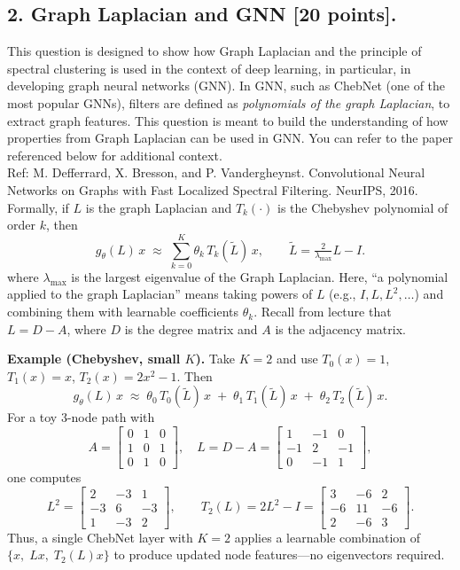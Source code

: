 \documentclass[twoside,10pt]{article}
\begin{document}
\clearpage

\subsection*{2. Graph Laplacian and GNN [20 points].}
This question is designed to show how Graph Laplacian and the principle of spectral clustering is used in the context of deep learning, in particular, in developing graph neural networks (GNN). In GNN, such as ChebNet (one of the most popular GNNs), filters are defined as \emph{polynomials of the graph Laplacian}, to extract graph features. This question is meant to build the understanding of how properties from Graph Laplacian can be used in GNN. You can refer to the paper referenced below for additional context. \\
Ref: M. Defferrard, X. Bresson, and P. Vandergheynst. Convolutional Neural Networks on Graphs with Fast Localized Spectral Filtering. NeurIPS, 2016.\\

Formally, if $L$ is the graph Laplacian and $T_k(\cdot)$ is the Chebyshev polynomial of order $k$, then
\[
g_\theta(L)\,x \;\approx\; \sum_{k=0}^K \theta_k\, T_k(\tilde{L})\, x,
\qquad \tilde{L}=\tfrac{2}{\lambda_{\max}}L - I .
\]
where $\lambda_{\max}$ is the largest eigenvalue of the Graph Laplacian. 
Here, ``a polynomial applied to the graph Laplacian'' means taking powers of $L$ (e.g., $I, L, L^2,\dots$) and combining them with learnable coefficients $\theta_k$.  
Recall from lecture that $L = D - A$, where $D$ is the degree matrix and $A$ is the adjacency matrix.  

\medskip
\textbf{Example (Chebyshev, small $K$).}  
Take $K=2$ and use $T_0(x)=1$, $T_1(x)=x$, $T_2(x)=2x^2-1$. Then
\[
g_\theta(L)\,x \;\approx\; \theta_0\,T_0(\tilde L)\,x \;+\; \theta_1\,T_1(\tilde L)\,x \;+\; \theta_2\,T_2(\tilde L)\,x.
\]
For a toy 3-node path with
\[
A=\begin{bmatrix}
0&1&0\\
1&0&1\\
0&1&0
\end{bmatrix},\quad
L=D-A=\begin{bmatrix}
1&-1&0\\
-1&2&-1\\
0&-1&1
\end{bmatrix},
\]
one computes
\[
L^2=\begin{bmatrix}
2&-3&1\\
-3&6&-3\\
1&-3&2
\end{bmatrix},\qquad
T_2(L)=2L^2-I=\begin{bmatrix}
3&-6&2\\
-6&11&-6\\
2&-6&3
\end{bmatrix}.
\]
Thus, a single ChebNet layer with $K=2$ applies a learnable combination of $\{x,\;Lx,\;T_2(L)x\}$ to produce updated node features---no eigenvectors required.
\end{document}
